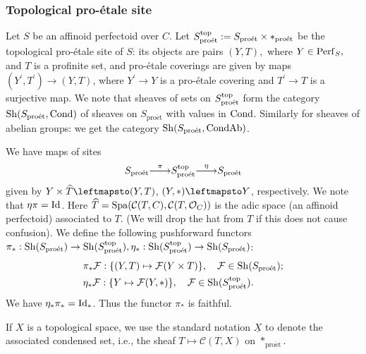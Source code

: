 \documentclass[10pt]{amsart}
\let\cal\mathcal
\theoremstyle{definition}
\theoremstyle{remark}
\def\lomapr#1{\smash{\mathop{\relbar\joinrel\longrightarrow}\limits^{#1}}}
\newcommand{\proeet}{\operatorname{pro\acute{e}t} }
\newcommand{\sff}{{\mathcal{F}}}
\newcommand{\scc}{{\mathcal{C}}}
\newcommand{\so}{{\mathcal O}}
\newcommand{\wh}{\widehat}
\numberwithin{equation}{section}
\numberwithin{equation}{section}
\begin{document}
\subsubsection{Topological pro-\'etale site} \label{naive-521} Let $S$  be an affinoid perfectoid  over $C$.  Let $S_{\proeet}^{\rm top}:=S_{\proeet}\times *_{\proeet}$ be the topological pro-\'etale site of $S$: its objects are pairs $(Y,T),$ where $Y\in{\rm Perf}_S,$ and $T$ is  a profinite set, and pro-\'etale coverings are given by maps $(Y^{\prime}, T^{\prime})\to (Y,T)$, where $Y^{\prime}\to Y$ is a  pro-\'etale covering and $T^{\prime}\to T$ is a surjective map.  We note that sheaves of sets on $S^{\rm top}_{\proeet}$ form the category ${\rm Sh}(S_{\proeet},{\rm Cond})$ of sheaves on $S_{\proeet}$ with values in ${\rm Cond}$. Similarly for sheaves of abelian groups: we get the category ${\rm Sh}(S_{\proeet},{\rm CondAb})$. 

  We have maps of sites 
$$
S_{\proeet}\lomapr{\pi} S_{\proeet}^{\rm top}\lomapr{\eta} S_{\proeet}
$$
given  by $Y\times \wh{T}\leftmapsto (Y,T)$,
$(Y,*)\leftmapsto Y$, respectively. We note that $\eta\pi={\rm Id}$.  Here $\wh{T}={\rm Spa}(\scc(T,C),\scc(T,\so_C))$ is the adic space (an affinoid perfectoid) associated to $T$. (We will drop the hat from $T$ if this does not cause confusion). 
We define the following pushforward functors $\pi_*: {\rm Sh}(S_{\proeet})\to {\rm Sh}(S^{\rm top}_{\proeet}), \eta_*: {\rm Sh}(S^{\rm top}_{\proeet})\to {\rm Sh}(S_{\proeet})$: 
\begin{align*}
& \pi_*\sff: \{(Y,  {T})\mapsto \sff(Y\times {T})\},\quad \sff\in{\rm Sh}(S_{\proeet});\\
& \eta_*\sff: \{Y\mapsto  \sff(Y,*)\},\quad  \sff\in{\rm Sh}(S^{\rm top}_{\proeet}).
\end{align*}
We have $\eta_*\pi_*={\rm Id}_*$. Thus the functor $\pi_*$ is faithful. 

If $X$ is a topological space, we use the standard notation $\underline{X}$ 
to denote the associated condensed set, i.e., the sheaf
$T\mapsto{\cal C}(T,X)$ on $*_{\proeet}$. 
\end{document}
